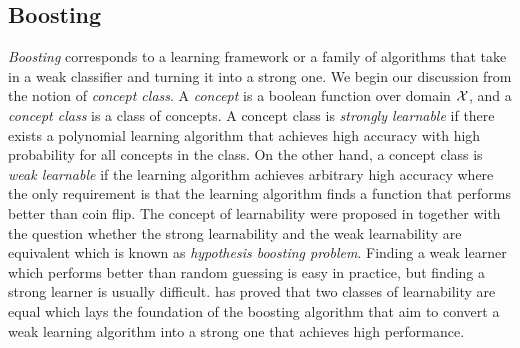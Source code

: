 {\subsection{Boosting}
\textit{Boosting} corresponds to a learning framework or a family of algorithms that take in a weak classifier and turning it into a strong one.
We begin our discussion from the notion of  \textit{concept class}.
A \textit{concept} is a boolean function over domain $\mathcal{X}$, and a \textit{concept class} is a class of concepts.
A concept class is \textit{strongly learnable} if there exists a polynomial learning algorithm that achieves high accuracy with high probability for all concepts in the class.
On the other hand, a concept class is \textit{weak learnable} if the learning algorithm achieves arbitrary high accuracy where the only requirement is that the learning algorithm finds a function that performs better than coin flip.
The concept of learnability were proposed in \citep{Kearns94cryptographic} together with the question whether the strong learnability and the weak learnability are equivalent which is known as \textit{hypothesis boosting problem}.
Finding a weak learner which performs better than random guessing is easy in practice, but finding a strong learner is usually difficult.
\citet{Schapire90the} has proved that two classes of learnability are equal which lays the foundation of the boosting algorithm that aim to convert a weak learning algorithm into a strong one that achieves high performance.

}
